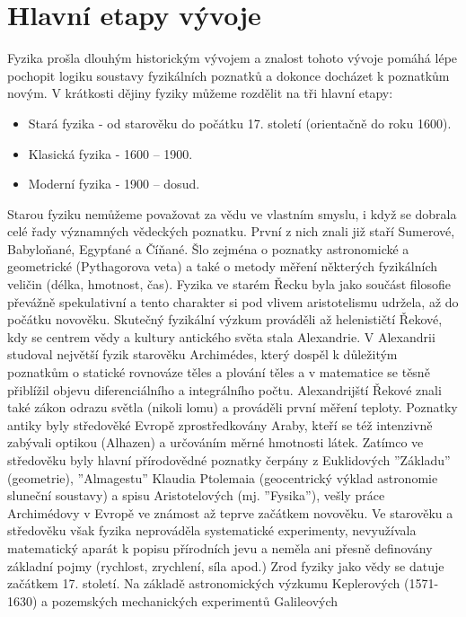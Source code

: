   \section{Hlavní etapy vývoje}
    Fyzika prošla dlouhým historickým vývojem a znalost tohoto vývoje pomáhá lépe pochopit logiku soustavy
    fyzikálních poznatků a dokonce do\-cházet k poznatkům novým. V krátkosti dějiny fyziky můžeme 
    rozdělit na 
    tři hlavní etapy:
    \begin{itemize}
     	\item Stará fyzika - od starověku do počátku 17. století (orientačně do roku 1600).
     \item Klasická fyzika - 1600 – 1900.
     \item Moderní fyzika - 1900 – dosud.
    \end{itemize}
    Starou fyziku nemůžeme považovat za vědu ve vlastním smyslu, i když se dobrala celé řady významných 
    vědeckých poznatku. První z nich znali již staří Sumerové, Babyloňané, Egypťané a Číňané. Šlo zejména 
    o  poznatky astronomické a geometrické (Pythagorova veta) a také o metody měření některých 
    fyzikálních veličin (délka, hmotnost, čas). Fyzika ve starém Řecku byla jako součást filosofie 
    převážně spekulativní a tento charakter si pod vlivem aristotelismu udržela, až do počátku novověku. 
    Skutečný fyzikální výzkum prováděli až helenističtí Řekové, kdy se centrem vědy a kultury antického 
    světa stala Alexandrie. V Alexandrii studoval největší fyzik starověku Archimédes, který dospěl k 
    důležitým poznatkům o statické rovnováze těles a plování těles a v matematice se těsně přiblížil 
    objevu diferenciálního a integrálního počtu. Alexandrijští Řekové znali také zákon odrazu světla 
    (nikoli lomu) a prováděli první měření teploty. Poznatky antiky byly středověké Evropě 
    zprostředkovány Araby, kteří se též intenzivně zabývali optikou (Alhazen) a určováním měrné hmotnosti 
    látek. Zatímco ve středověku byly hlavní přírodovědné poznatky čerpány z Euklidových ”Základu” 
    (geometrie), ”Almagestu” Klaudia Ptolemaia (geocentrický výklad astronomie sluneční soustavy) a spisu 
    Aristotelových (mj. ”Fysika”), vešly práce Archimédovy v Evropě ve známost až teprve začátkem 
    novověku. Ve starověku a středověku však fyzika neprováděla systematické experimenty, nevyužívala 
    matematický aparát k popisu přírodních jevu a neměla ani přesně definovány základní pojmy (rychlost, 
    zrychlení, síla apod.) Zrod fyziky jako vědy se datuje začátkem 17. století. Na základě  
    astronomických výzkumu Keplerových (1571-1630) a pozemských mechanických experimentů Galileových 
